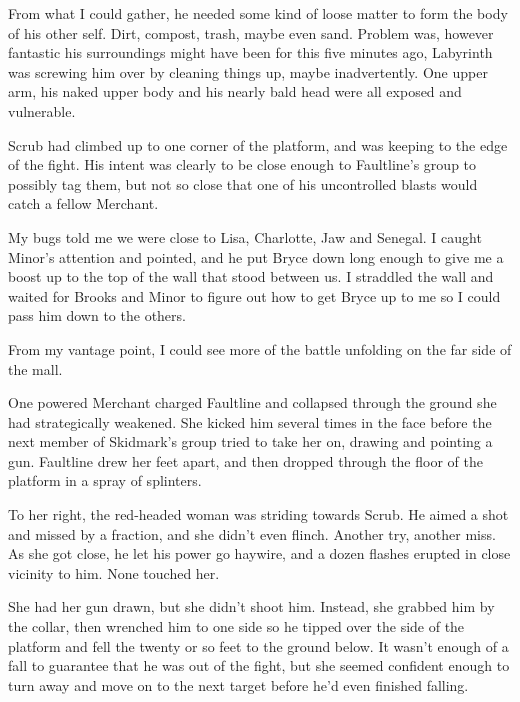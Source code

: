 From what I could gather, he needed some kind of loose matter to form the body of his other self.  Dirt, compost, trash, maybe even sand.  Problem was, however fantastic his surroundings might have been for this five minutes ago, Labyrinth was screwing him over by cleaning things up, maybe inadvertently.  One upper arm, his naked upper body and his nearly bald head were all exposed and vulnerable.



Scrub had climbed up to one corner of the platform, and was keeping to the edge of the fight.  His intent was clearly to be close enough to Faultline's group to possibly tag them, but not so close that one of his uncontrolled blasts would catch a fellow Merchant.



My bugs told me we were close to Lisa, Charlotte, Jaw and Senegal.  I caught Minor's attention and pointed, and he put Bryce down long enough to give me a boost up to the top of the wall that stood between us.  I straddled the wall and waited for Brooks and Minor to figure out how to get Bryce up to me so I could pass him down to the others.



From my vantage point, I could see more of the battle unfolding on the far side of the mall.



One powered Merchant charged Faultline and collapsed through the ground she had strategically weakened.  She kicked him several times in the face before the next member of Skidmark's group tried to take her on, drawing and pointing a gun.  Faultline drew her feet apart, and then dropped through the floor of the platform in a spray of splinters.



To her right, the red-headed woman was striding towards Scrub.  He aimed a shot and missed by a fraction, and she didn't even flinch.  Another try, another miss.  As she got close, he let his power go haywire, and a dozen flashes erupted in close vicinity to him.  None touched her.



She had her gun drawn, but she didn't shoot him.  Instead, she grabbed him by the collar, then wrenched him to one side so he tipped over the side of the platform and fell the twenty or so feet to the ground below.  It wasn't enough of a fall to guarantee that he was out of the fight, but she seemed confident enough to turn away and move on to the next target before he'd even finished falling.



